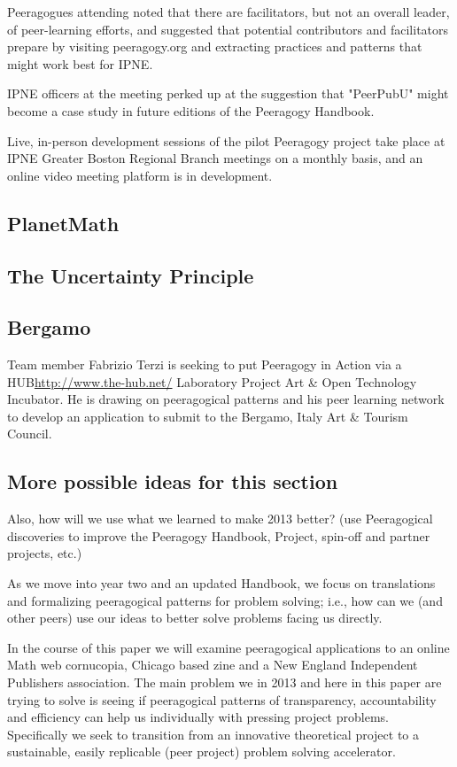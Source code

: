 \documentclass{acm_proc_article-sp}
\begin{document}
Peeragogues attending noted that there are facilitators, but not an overall leader, of peer-learning efforts, and suggested that potential contributors and facilitators prepare by visiting peeragogy.org and extracting practices and patterns that might work best for IPNE.

IPNE officers at the meeting perked up at the suggestion that "PeerPubU" might become a case study in future editions of the Peeragogy Handbook.

Live, in-person development sessions of the pilot Peeragogy project take place at IPNE Greater Boston Regional Branch meetings on a monthly basis, and an online video meeting platform is in development.

\subsection{PlanetMath}

\subsection{The Uncertainty Principle}

\subsection{Bergamo}

Team member Fabrizio Terzi is seeking to put Peeragogy in Action via a HUB\url{http://www.the-hub.net/} Laboratory Project Art \& Open Technology Incubator. He is drawing on peeragogical patterns and his peer learning network to develop an application to submit to the Bergamo, Italy Art \& Tourism Council.


\subsection{More possible ideas for this section}

Also, how will we use what we learned to make 2013 better? (use
Peeragogical discoveries to improve the Peeragogy Handbook, Project,
spin-off and partner projects, etc.)

As we move into year two and an updated Handbook, we focus on translations and formalizing peeragogical patterns for problem solving; i.e., how can we (and other peers) use our ideas to better solve problems facing us directly.

In the course of this paper we will examine peeragogical applications to an online Math web cornucopia, Chicago based zine and a New England Independent Publishers association. The main problem we in 2013 and here in this paper are trying to solve is seeing if peeragogical patterns of transparency, accountability and efficiency can help us individually with pressing project problems. Specifically we seek to transition from an innovative theoretical project to a sustainable, easily replicable (peer project) problem solving accelerator.
\end{document}
